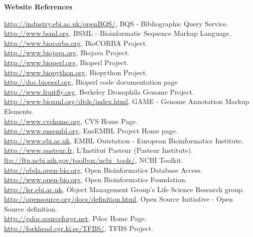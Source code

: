 \documentclass[12pt]{article}
\begin{document}
\begin{center}{\large \textbf{Website References}}\end{center}
\par \noindent
\url{http://industry.ebi.ac.uk/openBQS/}, BQS - Bibliographic Query Service.\\
\url{http://www.bsml.org}, BSML - Bioinformatic Sequence Markup Language. \\
\url{http://www.biocorba.org}, BioCORBA Project. \\
\url{http://www.biojava.org}, Biojava Project. \\
\url{http://www.bioperl.org}, Bioperl Project. \\
\url{http://www.biopython.org}, Biopython Project. \\
\url{http://doc.bioperl.org}, Bioperl code documentation page \\
\url{http://www.fruitfly.org}, Berkeley Drosophila Genome Project.\\
\url{http://www.bioxml.org/dtds/index.html},  GAME - Genome
Annotation Markup Elements. \\ 
\url{http://www.cvshome.org}, CVS Home Page. \\
\url{http://www.ensembl.org}, EnsEMBL Project Home page. \\
\url{http://www.ebi.ac.uk}, EMBL Outstation - European Bioinformatics
Institute. \\ 
\url{http://www.pasteur.fr}, L'Institut Pasteur (Pasteur Institute). \\
\url{ftp://ftp.ncbi.nih.gov/toolbox/ncbi_tools/}, NCBI Toolkit. \\
\url{http://obda.open-bio.org}, Open Bioinformatics Database Access. \\
\url{http://www.open-bio.org}, Open Bioinformatics Foundation. \\
\url{http://lsr.ebi.ac.uk}, Object Management Group's Life Science Research group. \\
\url{http://opensource.org/docs/definition.html}, Open Source
Initiative - Open Source definition. \\
\url{http://pdoc.sourceforge.net}, Pdoc Home Page. \\
\url{http://forkhead.cgr.ki.se/TFBS/}, TFBS Project. \\

\newpage

\pagestyle{fancy}
\fancyhf{}
\renewcommand{\headrulewidth}{0pt}

\end{document}
